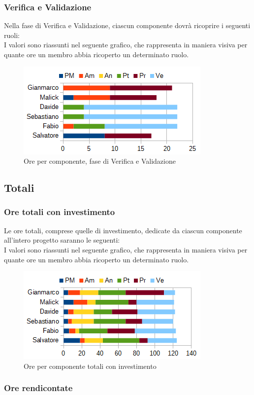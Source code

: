 		\subsubsection{Verifica e Validazione}
		Nella fase di Verifica e Validazione, ciascun componente dovrà ricoprire i seguenti ruoli: \\
		I valori sono riassunti nel seguente grafico, che rappresenta in maniera visiva per quante ore un membro abbia ricoperto un determinato ruolo.
		\begin{figure}[htbp]
			\centering
			\includegraphics[scale=1]{immagini/grafici/validazione-barra.png}
			\caption{Ore per componente, fase di Verifica e Validazione}
		\end{figure}
	\subsection{Totali}
		\subsubsection{Ore totali con investimento}
		Le ore totali, comprese quelle di investimento, dedicate da ciascun componente all'intero progetto saranno le seguenti: \\
		I valori sono riassunti nel seguente grafico, che rappresenta in maniera visiva per quante ore un membro abbia ricoperto un determinato ruolo.
		\begin{figure}[htbp]
			\centering
			\includegraphics[scale=1]{immagini/grafici/riepilogo_conclusivo-barra.png}
			\caption{Ore per componente totali con investimento}
		\end{figure}
		\subsubsection{Ore rendicontate}